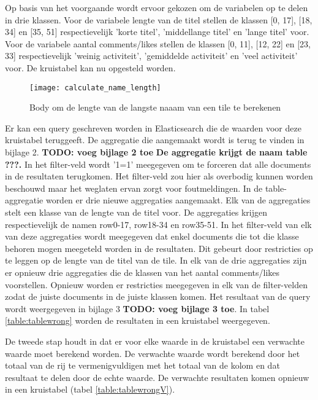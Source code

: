 Op basis van het voorgaande wordt ervoor gekozen om de variabelen op te delen in drie klassen. Voor de variabele lengte van de titel stellen de klassen [0, 17], [18, 34] en [35, 51] respectievelijk 'korte titel', 'middellange titel' en 'lange titel' voor. Voor de variabele aantal comments/likes stellen de klassen [0, 11], [12, 22] en [23, 33] respectievelijk 'weinig activiteit', 'gemiddelde activiteit' en 'veel activiteit' voor. De kruistabel kan nu opgesteld worden.

\begin{figure}
	\centering
	\texttt{[image: calculate\_name\_length]}
	\caption{Body om de lengte van de langste naaam van een tile te berekenen}
	\label{fig:calculatenamelength}
\end{figure}

Er kan een query geschreven worden in Elasticsearch die de waarden voor deze kruistabel teruggeeft. De aggregatie die aangemaakt wordt is terug te vinden in bijlage 2. \textbf{TODO: voeg bijlage 2 toe} \textbf{De aggregatie krijgt de naam table ???.} In het filter-veld wordt '1=1' meegegeven om te forceren dat alle documents in de resultaten terugkomen. Het filter-veld zou hier als overbodig kunnen worden beschouwd maar het weglaten ervan zorgt voor foutmeldingen. In de table-aggregatie worden er drie nieuwe aggregaties aangemaakt. Elk van de aggregaties stelt een klasse van de lengte van de titel voor. De aggregaties krijgen respectievelijk de namen row0-17, row18-34 en row35-51. In het filter-veld van elk van deze aggregaties wordt meegegeven dat enkel documents die tot die klasse behoren mogen meegeteld worden in de resultaten. Dit gebeurt door restricties op te leggen op de lengte van de titel van de tile. In elk van de drie aggregaties zijn er opnieuw drie aggregaties die de klassen van het aantal comments/likes voorstellen. Opnieuw worden er restricties meegegeven in elk van de filter-velden zodat de juiste documents in de juiste klassen komen. Het resultaat van de query wordt weergegeven in bijlage 3 \textbf{TODO: voeg bijlage 3 toe}. In tabel \ref{table:tablewrong} worden de resultaten in een kruistabel weergegeven.

De tweede stap houdt in dat er voor elke waarde in de kruistabel een verwachte waarde moet berekend worden. De verwachte waarde wordt berekend door het totaal van de rij te vermenigvuldigen met het totaal van de kolom en dat resultaat te delen door de echte waarde. De verwachte resultaten komen opnieuw in een kruistabel (tabel \ref{table:tablewrongV}).

